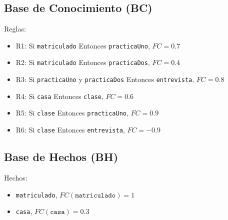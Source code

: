 \subsection{Base de Conocimiento (BC)}
Reglas:
\begin{itemize}
    \item R1: Si \texttt{matriculado} Entonces \texttt{practicaUno}, $FC=0.7$
    \item R2: Si \texttt{matriculado} Entonces \texttt{practicaDos}, $FC=0.4$
    \item R3: Si \texttt{practicaUno} y \texttt{practicaDos} Entonces \texttt{entrevista}, $FC=0.8$
    \item R4: Si \texttt{casa} Entonces \texttt{clase}, $FC=0.6$
    \item R5: Si \texttt{clase} Entonces \texttt{practicaUno}, $FC=0.9$
    \item R6: Si \texttt{clase} Entonces \texttt{entrevista}, $FC=-0.9$
\end{itemize}

\subsection{Base de Hechos (BH)}
Hechos:
\begin{itemize}
    \item \texttt{matriculado}, $FC(\texttt{matriculado}) = 1$
    \item \texttt{casa}, $FC(\texttt{casa}) = 0.3$
\end{itemize}
\newpage

